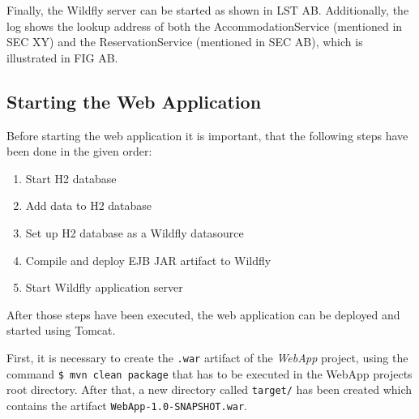 Finally, the Wildfly server can be started as shown in LST AB. Additionally, the log shows the lookup address of both the AccommodationService (mentioned in SEC XY) and the ReservationService (mentioned in SEC AB), which is illustrated in FIG AB.


\subsection{Starting the Web Application}
Before starting the web application it is important, that the following steps have been done in the given order:
\begin{enumerate}
\item Start H2 database
\item Add data to H2 database
\item Set up H2 database as a Wildfly datasource
\item Compile and deploy EJB JAR artifact to Wildfly
\item Start Wildfly application server
\end{enumerate}

After those steps have been executed, the web application can be deployed and started using Tomcat.

First, it is necessary to create the \texttt{.war} artifact of the \textit{WebApp} project, using the command \texttt{\$ mvn clean package} that has to be executed in the WebApp projects root directory. After that, a new directory called \texttt{target/} has been created which contains the artifact \texttt{WebApp-1.0-SNAPSHOT.war}.


